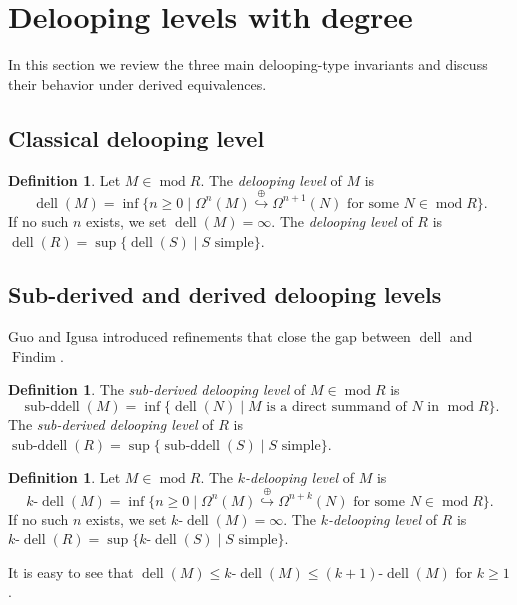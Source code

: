\documentclass[12pt,a4paper,reqno]{amsart}
\theoremstyle{plain}
\theoremstyle{definition}
\newtheorem{definition}[theorem]{Definition}
\theoremstyle{remark}
\DeclareMathOperator{\modd}{mod}
\DeclareMathOperator{\Findim}{Findim}
\DeclareMathOperator{\dell}{dell}
\DeclareMathOperator{\subddell}{sub\text{-}ddell}
\newcommand{\oemb}{\stackrel{\oplus}{\hookrightarrow}}
\begin{document}
\section{Delooping levels with degree}\label{sec:delooping}

In this section we review the three main delooping-type invariants and discuss their behavior under derived equivalences.

\subsection{Classical delooping level}

\begin{definition}\label{def:classical-dell}
Let $M \in \modd R$. The \emph{delooping level} of $M$ is
\[
\dell(M) = \inf\{n \geq 0 \mid \Omega^n(M)  \oemb  \Omega^{n+1}(N) \text{ for some } N \in \modd R\}.
\]
If no such $n$ exists, we set $\dell(M) = \infty$. The \emph{delooping level} of $R$ is $\dell(R) = \sup\{\dell(S) \mid S \text{ simple}\}$.
\end{definition}

\subsection{Sub-derived and derived delooping levels}

Guo and Igusa \cite{GuoIgusa} introduced refinements that close the gap between $\dell$ and $\Findim$.

\begin{definition}\label{def:subddell}
The \emph{sub-derived delooping level} of $M \in \modd R$ is
\[
\subddell(M) = \inf\{\dell(N) \mid M \text{ is a direct summand of } N \text{ in } \modd R\}.
\]
The \emph{sub-derived delooping level} of $R$ is $\subddell(R) = \sup\{\subddell(S) \mid S \text{ simple}\}$.
\end{definition}

\begin{definition}\label{def:k-dell}
Let $M \in \modd R$. The \emph{$k$-delooping level} of $M$ is
\[
k\text{-}\dell(M) = \inf\{n \geq 0 \mid \Omega^n(M)  \oemb  \Omega^{n+k}(N) \text{ for some } N \in \modd R\}.
\]
If no such $n$ exists, we set $k\text{-}\dell(M) = \infty$. The \emph{$k$-delooping level} of $R$ is $k\text{-}\dell(R) = \sup\{k\text{-}\dell(S) \mid S \text{ simple}\}$.
\end{definition}

It is easy to see that $\dell(M)\le k\text{-}\dell(M)\le (k+1)\text{-}\dell(M)$ for $k\ge 1$.
\end{document}

